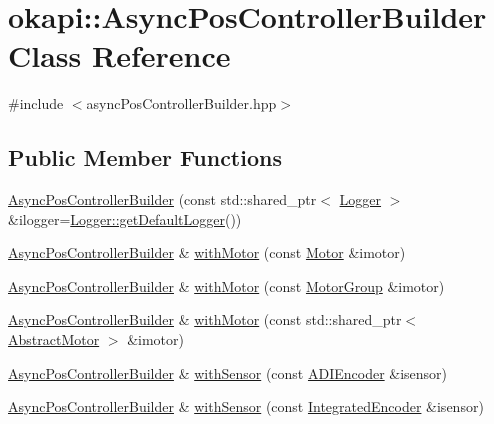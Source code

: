 \hypertarget{classokapi_1_1AsyncPosControllerBuilder}{}\section{okapi\+::Async\+Pos\+Controller\+Builder Class Reference}
\label{classokapi_1_1AsyncPosControllerBuilder}


{\ttfamily \#include $<$async\+Pos\+Controller\+Builder.\+hpp$>$}

\subsection*{Public Member Functions}
\begin{DoxyCompactItemize}
\item 
\mbox{\hyperlink{classokapi_1_1AsyncPosControllerBuilder_ab5016bcf0679d7bae87d19d21cbff95f}{Async\+Pos\+Controller\+Builder}} (const std\+::shared\+\_\+ptr$<$ \mbox{\hyperlink{classokapi_1_1Logger}{Logger}} $>$ \&ilogger=\mbox{\hyperlink{classokapi_1_1Logger_a5053cf778b4b55acba788a3797dc96d2}{Logger\+::get\+Default\+Logger}}())
\item 
\mbox{\hyperlink{classokapi_1_1AsyncPosControllerBuilder}{Async\+Pos\+Controller\+Builder}} \& \mbox{\hyperlink{classokapi_1_1AsyncPosControllerBuilder_afe930ec31b591b6b2bf80be12bba3d79}{with\+Motor}} (const \mbox{\hyperlink{classokapi_1_1Motor}{Motor}} \&imotor)
\item 
\mbox{\hyperlink{classokapi_1_1AsyncPosControllerBuilder}{Async\+Pos\+Controller\+Builder}} \& \mbox{\hyperlink{classokapi_1_1AsyncPosControllerBuilder_aa93b974218c68cdd213274446a7fe4c4}{with\+Motor}} (const \mbox{\hyperlink{classokapi_1_1MotorGroup}{Motor\+Group}} \&imotor)
\item 
\mbox{\hyperlink{classokapi_1_1AsyncPosControllerBuilder}{Async\+Pos\+Controller\+Builder}} \& \mbox{\hyperlink{classokapi_1_1AsyncPosControllerBuilder_a837f30643945bf8a5522c9a374ec98dc}{with\+Motor}} (const std\+::shared\+\_\+ptr$<$ \mbox{\hyperlink{classokapi_1_1AbstractMotor}{Abstract\+Motor}} $>$ \&imotor)
\item 
\mbox{\hyperlink{classokapi_1_1AsyncPosControllerBuilder}{Async\+Pos\+Controller\+Builder}} \& \mbox{\hyperlink{classokapi_1_1AsyncPosControllerBuilder_aab579369bc48c43c207cecc23d20b424}{with\+Sensor}} (const \mbox{\hyperlink{classokapi_1_1ADIEncoder}{A\+D\+I\+Encoder}} \&isensor)
\item 
\mbox{\hyperlink{classokapi_1_1AsyncPosControllerBuilder}{Async\+Pos\+Controller\+Builder}} \& \mbox{\hyperlink{classokapi_1_1AsyncPosControllerBuilder_ad6667ad29a7834452b50390294cde4fa}{with\+Sensor}} (const \mbox{\hyperlink{classokapi_1_1IntegratedEncoder}{Integrated\+Encoder}} \&isensor)

\end{DoxyCompactItemize}
